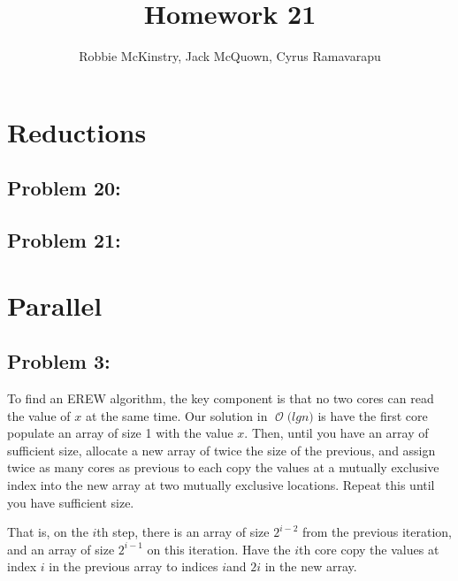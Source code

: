 \documentclass[12pt]{article}
\newcommand{\BigO}[1]{\ensuremath{\operatorname{\mathcal{O}}\bigl(#1\bigr)}}
\begin{document}
\title{Homework 21}
\author{Robbie McKinstry, Jack McQuown, Cyrus Ramavarapu}
\renewcommand{\today}{21 October 2016}
\renewcommand{\baselinestretch}{1.5}
\maketitle

\section*{Reductions}
\subsection*{Problem 20: }
\subsection*{Problem 21: }


\section*{Parallel}
\subsection*{Problem 3: }

To find an EREW algorithm, the key component is that no two cores can read the value of $x$ at the same time. Our solution in \BigO{lg n} is have the first core populate an array of size 1 with the value $x$. Then, until you have an array of sufficient size, allocate a new array of twice the size of the previous, and assign twice as many cores as previous to each copy the values at a mutually exclusive index into the new array at two mutually exclusive locations. Repeat this until you have sufficient size.

That is, on the $i$th step, there is an array of size $2^{i-2}$ from the previous iteration, and an array of size $2^{i-1}$ on this iteration. Have the $i$th core copy the values at index $i$ in the previous array to indices $i$and $2i$ in the new array.  
\end{document}

